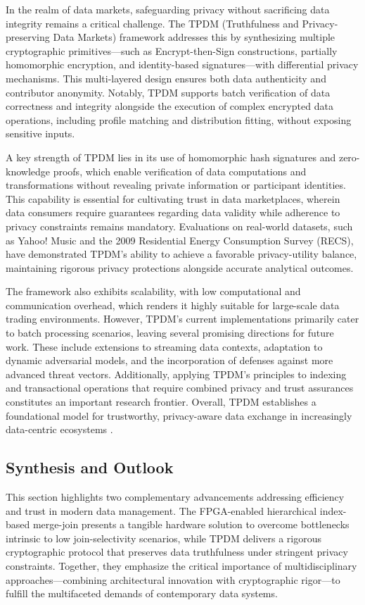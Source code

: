 \documentclass[11pt]{article}
\begin{document}
In the realm of data markets, safeguarding privacy without sacrificing data integrity remains a critical challenge. The TPDM (Truthfulness and Privacy-preserving Data Markets) framework addresses this by synthesizing multiple cryptographic primitives—such as Encrypt-then-Sign constructions, partially homomorphic encryption, and identity-based signatures—with differential privacy mechanisms. This multi-layered design ensures both data authenticity and contributor anonymity. Notably, TPDM supports batch verification of data correctness and integrity alongside the execution of complex encrypted data operations, including profile matching and distribution fitting, without exposing sensitive inputs.

A key strength of TPDM lies in its use of homomorphic hash signatures and zero-knowledge proofs, which enable verification of data computations and transformations without revealing private information or participant identities. This capability is essential for cultivating trust in data marketplaces, wherein data consumers require guarantees regarding data validity while adherence to privacy constraints remains mandatory. Evaluations on real-world datasets, such as Yahoo! Music and the 2009 Residential Energy Consumption Survey (RECS), have demonstrated TPDM’s ability to achieve a favorable privacy-utility balance, maintaining rigorous privacy protections alongside accurate analytical outcomes.

The framework also exhibits scalability, with low computational and communication overhead, which renders it highly suitable for large-scale data trading environments. However, TPDM’s current implementations primarily cater to batch processing scenarios, leaving several promising directions for future work. These include extensions to streaming data contexts, adaptation to dynamic adversarial models, and the incorporation of defenses against more advanced threat vectors. Additionally, applying TPDM’s principles to indexing and transactional operations that require combined privacy and trust assurances constitutes an important research frontier. Overall, TPDM establishes a foundational model for trustworthy, privacy-aware data exchange in increasingly data-centric ecosystems \cite{ref25}.

\subsection{Synthesis and Outlook}

This section highlights two complementary advancements addressing efficiency and trust in modern data management. The FPGA-enabled hierarchical index-based merge-join presents a tangible hardware solution to overcome bottlenecks intrinsic to low join-selectivity scenarios, while TPDM delivers a rigorous cryptographic protocol that preserves data truthfulness under stringent privacy constraints. Together, they emphasize the critical importance of multidisciplinary approaches—combining architectural innovation with cryptographic rigor—to fulfill the multifaceted demands of contemporary data systems.
\end{document}
